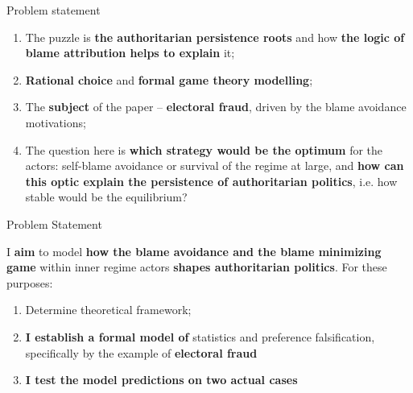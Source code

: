 \documentclass{beamer}
\begin{document}
\begin{frame}{Problem statement}
    
    \begin{enumerate}
    
        \item The puzzle is \textbf{the authoritarian persistence roots} and how \textbf{the logic of blame attribution helps to explain} it;
        
        \item \textbf{Rational choice} and \textbf{formal game theory modelling};
        
        \item The \textbf{subject} of the paper -- \textbf{electoral fraud}, driven by the blame avoidance motivations;
        
        
        \item The question here is \textbf{which strategy would be the optimum} for the actors: self-blame avoidance or survival of the regime at large, and \textbf{how can this optic explain the persistence of authoritarian politics}, i.e. how stable would be the equilibrium?
        
    \end{enumerate}

\end{frame}


\begin{frame}{Problem Statement}
    \centering
    
    I \textbf{aim} to model \textbf{how the blame avoidance and the blame minimizing game} within inner regime actors \textbf{shapes  authoritarian politics}. For these purposes:
    
    \begin{enumerate}
        
        \item Determine theoretical framework;
        
        \item \textbf{I establish a formal model of} statistics and preference falsification, specifically by the example of \textbf{electoral fraud}
        
        \item \textbf{I test the model predictions on two actual cases}
        
    \end{enumerate}
    
\end{frame}
\end{document}
